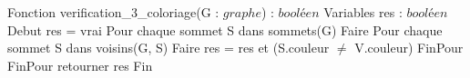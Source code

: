 \begin{algorithm}[caption={Vérification 3-coloriage}] \label{alg:3color_verif}
    Fonction verification_3_coloriage(G : $graphe$) : $booléen$
        Variables
            res : $booléen$
        Debut
            res = vrai
            Pour chaque sommet S dans sommets(G) Faire
                Pour chaque sommet S dans voisins(G, S) Faire
                    res = res et (S.couleur $\ne$ V.couleur)
                FinPour
            FinPour
            retourner res
        Fin
\end{algorithm}